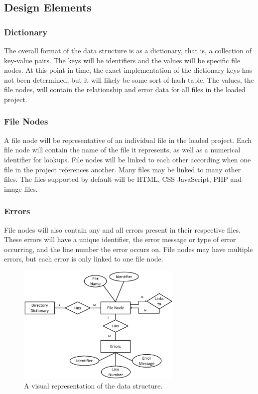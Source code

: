 \documentclass[letterpaper,10pt,titlepage,draftclsnofoot,onecolumn,onesided] {IEEEtran}
\begin{document}
\subsection{Design Elements}

\subsubsection{Dictionary}
The overall format of the data structure is as a dictionary, that is, a collection of key-value pairs. 
The keys will be identifiers and the values will be specific file nodes. 
At this point in time, the exact implementation of the dictionary keys has not been determined, but it will likely be some sort of hash table.
The values, the file nodes, will contain the relationship and error data for all files in the loaded project.

\subsubsection{File Nodes}
A file node will be representative of an individual file in the loaded project. 
Each file node will contain the name of the file it represents, as well as a numerical identifier for lookups.
File nodes will be linked to each other according when one file in the project references another. 
Many files may be linked to many other files.
The files supported by default will be HTML, CSS JavaScript, PHP and image files.
		
\subsubsection{Errors}
File nodes will also contain any and all errors present in their respective files.
These errors will have a unique identifier, the error message or type of error occurring, and the line number the error occurs on.
File nodes may have multiple errors, but each error is only linked to one file node.

\begin{figure}
        \includegraphics[width=300px]{InformationERDEPS.eps}
        \caption{A visual representation of the data structure.}
\end{figure}
				
\end{document}
